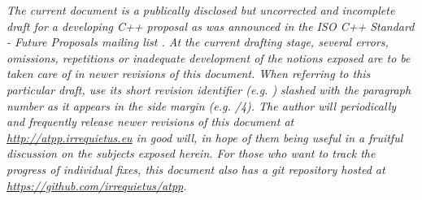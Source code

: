 
\textit{{\color{tone1} The current document is a publically disclosed but uncorrected and incomplete draft for a developing C++ proposal as was announced in the ISO C++ Standard - Future Proposals mailing list \cite{Mak2014}.
{\textbf{\color{red}{It does not constitute a complete work yet.}}}
At the current drafting stage, several errors, omissions, repetitions or inadequate development of the notions exposed are to be taken care of in newer revisions of this document.
When referring to this particular draft, use its short revision identifier (e.g. {\color{magenta}{\GitShortRev{}}}) slashed with the paragraph number as it appears in the side margin (e.g. {\color{magenta}{\GitShortRev{}}/4}).
The author will periodically and frequently release newer revisions of this document at \href{http://atpp.irrequietus.eu}{http://atpp.irrequietus.eu} in good will, in hope of them being useful in a fruitful discussion on the subjects exposed herein.
For those who want to track the progress of individual fixes, this document also has a git repository hosted at \textit{\href{https://github.com/irrequietus/atpp}{https://github.com/irrequietus/atpp}}.}}
